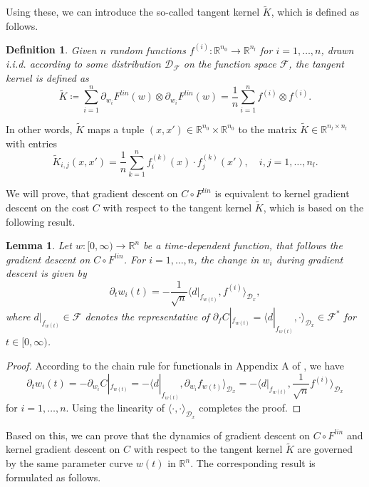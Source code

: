 \documentclass[11pt, a4paper]{article}
\newtheorem{lemma}[theorem]{Lemma}
\newtheorem{definition}[theorem]{Definition}
\newcommand{\R}{\mathbb{R}}
\newcommand{\D}{\mathcal{D}}
\newcommand{\F}{\mathcal{F}}
\begin{document}
Using these, we can introduce the so-called tangent kernel $\tilde{K}$, which is defined as follows.

\begin{definition}
Given $n$ random functions $f^{(i)} : \R^{n_0} \to \R^{n_l}$ for $i=1,\dots,n$, drawn i.i.d. according to some distribution $\D_{\F}$ on the function space $\F$, the tangent kernel is defined as
\[ \tilde{K} \coloneq \sum_{i=1}^{n} \partial_{w_i} F^\textit{lin}(w) \otimes \partial_{w_i} F^\textit{lin}(w) = \frac{1}{n} \sum_{i=1}^{n} f^{(i)} \otimes f^{(i)}. \]
\end{definition}

In other words, $\tilde{K}$ maps a tuple $(x,x') \in \R^{n_0} \times \R^{n_0}$ to the matrix $\tilde{K} \in \R^{n_l \times n_l}$ with entries 
\[ \tilde{K}_{i,j}(x,x') = \frac{1}{n} \sum_{k=1}^{n} f_i^{(k)}(x) \cdot f_j^{(k)}(x'), \quad  i,j=1,\dots,n_l. \]

We will prove, that gradient descent on $C \circ F^\textit{lin}$ is equivalent to kernel gradient descent on the cost $C$ with respect to the tangent kernel $\tilde{K}$, which is based on the following result.

\begin{lemma} \label{lem:evolution}
Let $w: [0, \infty) \to \R^n$ be a time-dependent function, that follows the gradient descent on $C \circ F^\textit{lin}$. For $i=1, \dots, n$, the change in $w_i$ during gradient descent is given by
\[ \partial_tw_i(t) = - \frac{1}{\sqrt{n}} \big \langle d|_{f_{w(t)}}, f^{(i)} \big \rangle_{\D_x}, \]
where $d|_{f_{w(t)}} \in \F$ denotes the representative of $\partial_f C|_{f_{w(t)}} = \big \langle d|_{f_{w(t)}}, \cdot \big \rangle_{\D_x} \in \F^*$ for $t \in [0,\infty)$.
\end{lemma}

\begin{proof}
According to the chain rule for functionals in Appendix A of \cite{Functionals}, we have
\[ \partial_tw_i(t) = - \partial_{w_{i}} C|_{f_{w(t)}} = - \big \langle d|_{f_{w(t)}}, \partial_{w_i} f_{w(t)} \big \rangle_{\D_x} = - \big \langle d|_{f_{w(t)}}, \frac{1}{\sqrt{n}} f^{(i)} \big \rangle_{\D_x} \]
for $i = 1, \dots, n$. Using the linearity of $\langle \cdot, \cdot \rangle_{\D_x}$ completes the proof.
\end{proof}

Based on this, we can prove that the dynamics of gradient descent on $C \circ F^\textit{lin}$ and kernel gradient descent on $C$ with respect to the tangent kernel $\tilde{K}$ are governed by the same parameter curve $w(t)$ in $\R^n$. The corresponding result is formulated as follows.
\end{document}
